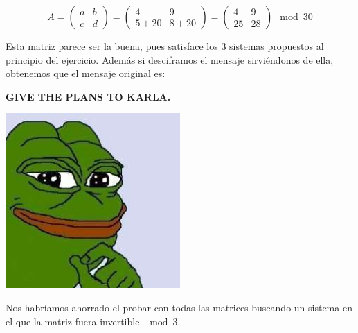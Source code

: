 \begin{problem}[5]
\[
	A=
	\left( \begin{array}{cc}
		a & b \\
		c & d
	\end{array} \right) =
	\left( \begin{array}{cc}
		4 & 9 \\
		5+20 & 8+20
	\end{array} \right)=
	\left( \begin{array}{cc}
		4 & 9 \\
		25 & 28
	\end{array} \right) \mod 30
\]

Esta matriz parece ser la buena, pues satisface los 3 sistemas propuestos al principio del ejercicio. Además si desciframos el mensaje sirviéndonos de ella, obtenemos que el mensaje original es:
\begin{center}
	\textbf{GIVE THE PLANS TO KARLA.}
\end{center}



\begin{center}
	\includegraphics[width=0.5\textwidth]{img/4chan_frog.jpg}
\end{center}


\obs Nos habríamos ahorrado el probar con todas las matrices buscando un sistema en el que la matriz fuera invertible $\mod 3$.

\end{problem}

